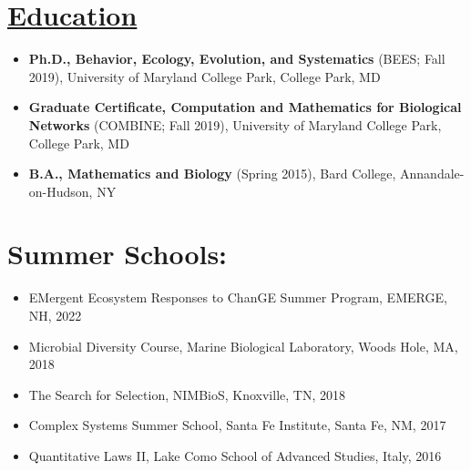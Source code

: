 \documentclass[]{res}
\begin{document}
\begin{resume}
\begin{itemize}[leftmargin=*]
\section{\underline{Education}} %

\begin{itemize}[leftmargin=*]
\setlength\itemsep{0.5em}
\item[] {\bf Ph.D., Behavior, Ecology, Evolution, and Systematics} (BEES; Fall 2019),
University of Maryland College Park, College Park, MD

\item[] {\bf Graduate Certificate, Computation and Mathematics for Biological Networks} (COMBINE; Fall 2019),
University of Maryland College Park, College Park, MD

\item[]  {\bf B.A., Mathematics and Biology}  (Spring 2015), Bard College, Annandale-on-Hudson, NY
\end{itemize}

 
\section{{Summer Schools:}}%
\begin{itemize}[leftmargin=*]
\item[] {EMergent Ecosystem Responses to ChanGE Summer Program}, EMERGE, NH, 2022
\item[] {Microbial Diversity Course}, Marine Biological Laboratory, Woods Hole, MA, 2018
\item[] {The Search for Selection}, NIMBioS, Knoxville, TN, 2018
\item[] {Complex Systems Summer School}, Santa Fe Institute, Santa Fe, NM, 2017
\item[] {Quantitative Laws II}, Lake Como School of Advanced Studies, Italy, 2016  
 \end{itemize}
 
 \end{itemize}
 

\end{resume}
\end{document}

